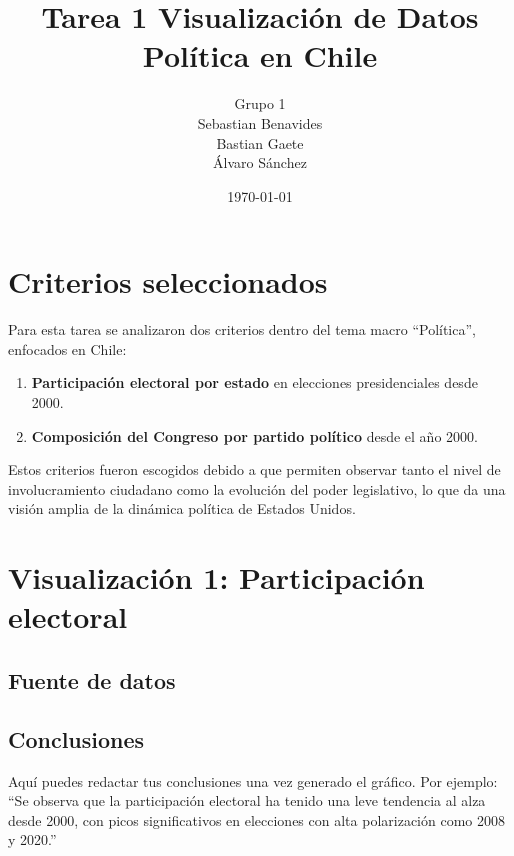 \documentclass[12pt]{article}
\title{Tarea 1 \- Visualización de Datos\\\large Política en Chile}
\author{Grupo 1\\Sebastian Benavides\\ Bastian Gaete\\ Álvaro Sánchez\\}
\date{\today}
\begin{document}
\maketitle

\section*{Criterios seleccionados}

Para esta tarea se analizaron dos criterios dentro del tema macro “Política”, enfocados en Chile:

\begin{enumerate}
    \item \textbf{Participación electoral por estado} en elecciones presidenciales desde 2000.
    \item \textbf{Composición del Congreso por partido político} desde el año 2000.
\end{enumerate}

Estos criterios fueron escogidos debido a que permiten observar tanto el nivel de involucramiento ciudadano como la evolución del poder legislativo, lo que da una visión amplia de la dinámica política de Estados Unidos.

\section*{Visualización 1: Participación electoral}


\subsection*{Fuente de datos}

\subsection*{Conclusiones}
Aquí puedes redactar tus conclusiones una vez generado el gráfico. Por ejemplo: \\
“Se observa que la participación electoral ha tenido una leve tendencia al alza desde 2000, con picos significativos en elecciones con alta polarización como 2008 y 2020.”
\end{document}
